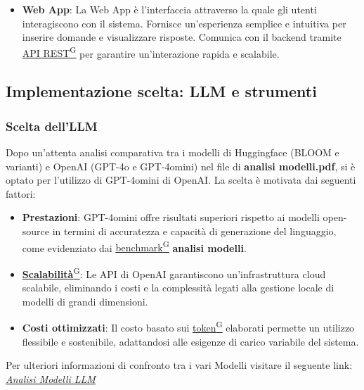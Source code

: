 \begin{itemize}
    \item \textbf{Web App}:  
    La Web App è l’interfaccia attraverso la quale gli utenti interagiscono con il sistema. Fornisce un’esperienza semplice e intuitiva per inserire domande e visualizzare risposte. Comunica con il backend tramite \href{https://code7crusaders.github.io/docs/PB/documentazione_interna/glossario.html#api-rest-representational-state-transfer}{API REST\textsuperscript{G}} per garantire un'interazione rapida e scalabile.
\end{itemize}

\subsection{Implementazione scelta: LLM e strumenti}
\subsubsection{Scelta dell'LLM}
Dopo un'attenta analisi comparativa tra i modelli di Huggingface (BLOOM e varianti) e OpenAI (GPT-4o e GPT-4omini) nel file di \textbf{analisi modelli.pdf}, si è optato per l'utilizzo di GPT-4omini di OpenAI. La scelta è motivata dai seguenti fattori:
\begin{itemize}
    \item \textbf{Prestazioni}: GPT-4omini offre risultati superiori rispetto ai modelli open-source in termini di accuratezza e capacità di generazione del linguaggio, come evidenziato dai \href{https://code7crusaders.github.io/docs/PB/documentazione_interna/glossario.html#benchmark}{benchmark\textsuperscript{G}} \textbf{analisi modelli}.
    \item \href{https://code7crusaders.github.io/docs/PB/documentazione_interna/glossario.html#scalabilità}{\textbf{Scalabilità}\textsuperscript{G}}: Le API di OpenAI garantiscono un'infrastruttura cloud scalabile, eliminando i costi e la complessità legati alla gestione locale di modelli di grandi dimensioni.
    \item \textbf{Costi ottimizzati}: Il costo basato sui \href{https://code7crusaders.github.io/docs/PB/documentazione_interna/glossario.html#token}{token\textsuperscript{G}} elaborati permette un utilizzo flessibile e sostenibile, adattandosi alle esigenze di carico variabile del sistema.
    \end{itemize}
    Per ulteriori informazioni di confronto tra i vari Modelli visitare il seguente link:
    \href{https://code7crusaders.github.io/docs/altri_documenti/analisi_modelli_firmato.html}{\textit{\underline{Analisi Modelli LLM}}}


